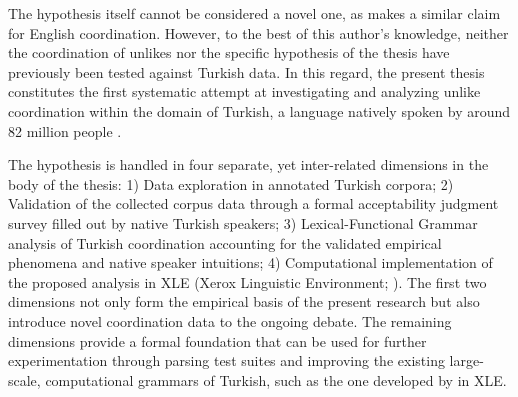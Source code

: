\begin{sloppypar}
The hypothesis itself cannot be considered a novel one, as \citet{peterson2004} makes a similar claim for English coordination. However, to the best of this author's knowledge, neither the coordination of unlikes nor the specific hypothesis of the thesis have previously been tested against Turkish data. In this regard, the present thesis constitutes the first systematic attempt at investigating and analyzing unlike coordination within the domain of Turkish, a language natively spoken by around 82 million people \citep{turkish_ethnologue}.


The hypothesis is handled in four separate, yet inter-related dimensions in the body of the thesis: 1) Data exploration in annotated Turkish corpora; 2) Validation of the collected corpus data through a formal acceptability judgment survey filled out by native Turkish speakers; 3) Lexical-Functional Grammar analysis of Turkish coordination accounting for the validated empirical phenomena and native speaker intuitions; 4) Computational implementation of the proposed analysis in XLE (Xerox Linguistic Environment; \citealp{xle}). The first two dimensions not only form the empirical basis of the present research but also introduce novel coordination data to the ongoing debate. The remaining dimensions provide a formal foundation that can be used for further experimentation through parsing test suites and improving the existing large-scale, computational grammars of Turkish, such as the one developed by \citet{cetinoglu2009} in XLE.
\end{sloppypar}